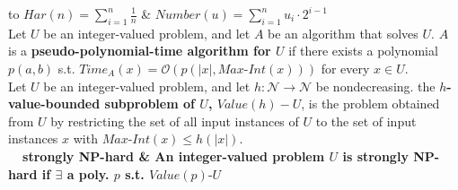 \setlength{\tabcolsep}{6pt}
\begin{tabu} to \linewidth {X[-2.5,c]|X[c,m]}
  $\displaystyle Har(n) = \sum_{i=1}^n \frac1n$ & $\displaystyle Number(u) =
  \sum_{i=1}^n u_i \cdot 2^{i-1}$ \\ \hline
  {Let $U$ be an integer-valued problem, and let $A$ be an algorithm that solves
   $U$. $A$ is a {\bf pseudo-polynomial-time algorithm for $U$} if there exists
   a polynomial $p(a,b)$ s.t. $Time_A(x) = \mathcal{O}(p(|x|,
   Max\text{-}Int(x)))$ for every $x \in U$.} \\ \hline
  {Let $U$ be an integer-valued problem, and let $h : \mathcal{N} \rightarrow
   \mathcal{N}$ be nondecreasing. the {\bf $h$-value-bounded subproblem of $U$,
   $Value(h)-U$}, is the problem obtained from $U$ by restricting the set of all
   input instances of $U$ to the set of input instances $x$ with
   $Max\text{-}Int(x) \leq h(|x|)$.} \\ \hline
   \bf ~~strongly \newline NP-hard & An integer-valued problem $U$ is {\bf
  strongly NP-hard} if $\exists$ a poly. $p$ s.t. $Value(p)\text{-}U$ \\ \hline
\end{tabu}
